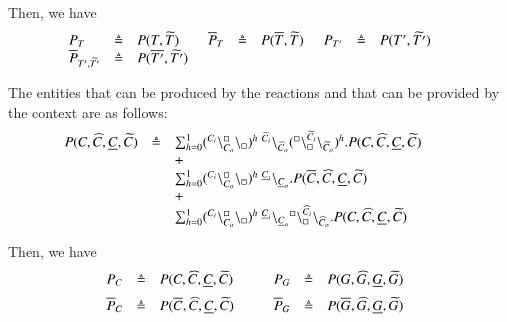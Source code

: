 Then, we have
\[
\begin{array}{lcl @{\hspace{0.5cm}}lcl @{\hspace{0.5cm}}lcl @{\hspace{0.5cm}}lcl}
P_T & \defeq & P(T,\widetilde{T})& \overline{P}_T & \defeq & P(\overline{T},\widetilde{T}) & P_{T'}& \defeq & P(T',\widetilde{T'}) & \\
\overline{P}_{T',\widetilde{T'}}& \defeq & P(\overline{T'},\widetilde{T'})
\end{array}
\]

The entities that can be produced by the reactions and that can be  provided by the context are as follows:
\[
\begin{array}{lcl @{\hspace{1cm}}lcl}
P(C,\widehat{C},\underline{C},\widetilde{C}) & \defeq &  \sum_{h=0}^1 (\startchain{C_i}\chainedlink{C_o}{\noact}\chainend{\noact})^h\ \link{\widehat{C}_i}{\widehat{C}_o} (\startchain{\noact}\chainedlink{\noact}{\widetilde{C}_i}\chainend{\widetilde{C}_o})^h.   P(C,\widehat{C},\underline{C},\widetilde{C})\\
&&+\\
&& \sum_{h=0}^1 (\startchain{C_i}\chainedlink{C_o}{\noact}\chainend{\noact})^h\ \link{\underline{C}_i}{\underline{C}_o}.P(\overline{C},\widehat{C},\underline{C},\widetilde{C})\\
&&+\\
 && \sum_{h=0}^1 (\startchain{C_i}\chainedlink{C_o}{\noact}\chainend{\noact})^h\ \link{\underline{C}_i}{\underline{C}_o} \startchain{\noact}\chainedlink{\noact}{\widehat{C}_i}\chainend{\widehat{C}_o}.   P(C,\widehat{C},\underline{C},\widetilde{C}) \\
\end{array}
\]

Then, we have
\[
\begin{array}{lcl @{\hspace{1cm}}lcl@{\hspace{0.4cm}}lcl@{\hspace{0.4cm}}lcl}
P_C & \defeq &  P(C,\widehat{C},\underline{C},\widetilde{C})&  P_G& \defeq &   P(G,\widehat{G},\underline{G},\widetilde{G}) \\[6pt]
\overline{P}_C & \defeq &  P(\overline{C},\widehat{C},\underline{C},\widetilde{C}) & 
\overline{P}_G& \defeq &   P(\overline{G},\widehat{G},\underline{G},\widetilde{G})\\
\end{array}
\]

